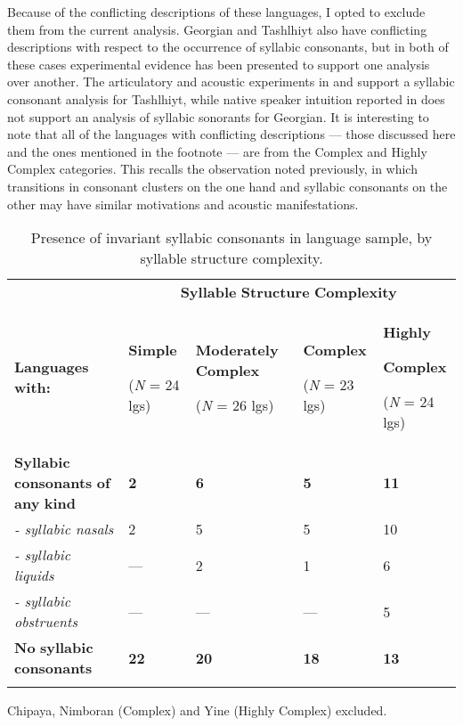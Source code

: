 Because of the conflicting descriptions of these languages, I opted to exclude them from the current analysis. Georgian and Tashlhiyt also have conflicting descriptions with respect to the occurrence of syllabic consonants, but in both of these cases experimental evidence has been presented to support one analysis over another. The articulatory and acoustic experiments in \citet{Ridouane2008} and \citet{GoldsteinEtAl2007} support a syllabic consonant analysis for Tashlhiyt, while native speaker intuition reported in \citet{Chitoran1999} does not support an analysis of syllabic sonorants for Georgian. It is interesting to note that all of the languages with conflicting descriptions — those discussed here and the ones mentioned in the footnote — are from the Complex and Highly Complex categories. This recalls the observation noted previously, in which transitions in consonant clusters on the one hand and syllabic consonants on the other may have similar motivations and acoustic manifestations.






\begin{table}
\begin{tabularx}{\textwidth}{XXXXX}
 & \multicolumn{4}{c}{ \textbf{Syllable} \textbf{Structure} \textbf{Complexity}}\\
\lsptoprule
 \textbf{Languages} \textbf{with:} & { \textbf{Simple}}

 (\textit{N} = 24 lgs) & { \textbf{Moderately} \textbf{Complex}}

 (\textit{N} = 26 lgs) & { \textbf{Complex}}

 (\textit{N} = 23 lgs) & { \textbf{Highly} }

{ \textbf{Complex}}

 (\textit{N} = 24 lgs)\\
 \textbf{Syllabic} \textbf{consonants} \textbf{of} \textbf{any} \textbf{kind} & \textbf{2} & \textbf{6} & \textbf{5} & \textbf{11}\\
 \textit{{}- syllabic nasals} & 2 & 5 & 5 & 10\\
 \textit{{}- syllabic liquids} & — & 2 & 1 & 6\\
 \textit{{}- syllabic obstruents} & — & — & — & 5\\
 \textbf{No} \textbf{syllabic} \textbf{consonants} & \textbf{22} & \textbf{20} & \textbf{18} & \textbf{13}\\
\lspbottomrule
\end{tabularx}
\caption{\label{3.6}Presence of invariant syllabic consonants in language sample, by syllable structure complexity.}Chipaya, Nimboran (Complex) and Yine (Highly Complex) excluded.
\end{table}




